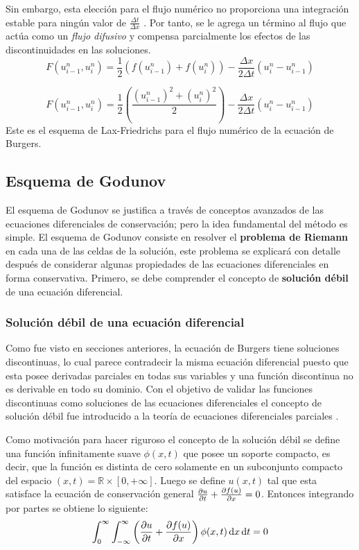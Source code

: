 \documentclass[12pt]{article}
\begin{document}
	Sin embargo, esta elección para el flujo numérico no proporciona una integración estable para ningún valor de $\frac{\Delta t}{\Delta x}$ \cite{LeVeque1998}. Por tanto, se le agrega un término al flujo que actúa como un \textit{flujo difusivo} y compensa parcialmente los efectos de las discontinuidades en las soluciones.
	\begin{equation}
		{F(u_{i-1}^{n}, u_{i}^{n}) = \frac{1}{2} \left(f(u_{i-1}^{n}) + f(u_{i}^{n})\right)  - \frac{\Delta x}{2\Delta t}(u_{i}^{n}-u_{i-1}^{n})}
		\label{eq:flujo-LF}
	\end{equation}

	\begin{equation}
		{\boxed{F(u_{i-1}^{n}, u_{i}^{n}) = \frac{1}{2} \left( \frac{(u_{i-1}^{n})^2 + (u_{i}^{n})^2}{2} \right)  - \frac{\Delta x}{2\Delta t}(u_{i}^{n}-u_{i-1}^{n})} }
	\end{equation}
	Este es el esquema de Lax-Friedrichs para el flujo numérico de la ecuación de Burgers.
	
	\subsection{Esquema de Godunov}
	El esquema de Godunov se justifica a través de conceptos avanzados de las ecuaciones diferenciales de conservación; pero la idea fundamental del método es simple. El esquema de Godunov consiste en resolver el \textbf{problema de Riemann} en cada una de las celdas de la solución, este problema se explicará con detalle después de considerar algunas propiedades de las ecuaciones diferenciales en forma conservativa. Primero, se debe comprender el concepto de \textbf{solución débil} de una ecuación diferencial.
	\subsubsection{Solución débil de una ecuación diferencial}
	Como fue visto en secciones anteriores, la ecuación de Burgers tiene soluciones discontinuas, lo cual parece contradecir la misma ecuación diferencial puesto que esta posee derivadas parciales en todas sus variables y una función discontinua no es derivable en todo su dominio. Con el objetivo de validar las funciones discontinuas como soluciones de las ecuaciones diferenciales el concepto de solución débil fue introducido a la teoría de ecuaciones diferenciales parciales \cite{Cameron}.
	
	Como motivación para hacer riguroso el concepto de la solución débil se define una función infinitamente suave $\phi(x,t)$ que posee un soporte compacto, es decir, que la función es distinta de cero solamente en un subconjunto compacto del espacio $(x,t)= \mathbb{R} \times \left[ 0, + \infty \right] $. Luego se define $u(x,t)$ tal que esta satisface la ecuación de conservación general $\pdv{u}{t} + \pdv{f(u)}{x}=0$. Entonces integrando por partes se obtiene lo siguiente:
	\begin{equation}
		\int_{0}^{\infty}\int_{-\infty}^{\infty}\left( \pdv{u}{t} + \pdv{f(u)}{x} \right)\phi(x,t)\dd{x}\dd{t} = 0
		\label{eq:integral_conservative1}
	\end{equation}
	 
\end{document}
